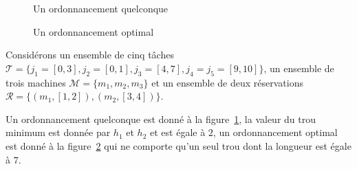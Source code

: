 \documentclass[a4paper,11pt]{thesis}
\begin{document}
\begin{figure}
    \begin{center}
        \begin{ordo}[10]{3}{1}{10}


        \end{ordo}
    \end{center}
    \caption{Un ordonnancement quelconque}
    \label{ex1ordquelc}
\end{figure}
            
\begin{figure}
    \begin{center}
        \begin{ordo}[10]{3}{1}{10}


        \end{ordo}
    \end{center}
    \caption{Un ordonnancement optimal}
    \label{ex1ordopt}
\end{figure}

\begin{ex}
    Considérons un ensemble de cinq tâches $\mathcal{T} = \{j_1 = [0, 3], j_2 = [0,1], j_3 = [4,7],
    j_4 = j_5 = [9,10]\}$, un ensemble de trois machines $\mathcal{M} = \{m_1, m_2, m_3\}$ et un
    ensemble de deux réservations $\mathcal{R} = \{(m_1, [1,2]), (m_2, [3,4])\}$.

    Un ordonnancement quelconque est donné à la figure~\ref{ex1ordquelc}, la valeur du trou minimum
    est donnée par $h_1$ et $h_2$ et est égale à $2$, un ordonnancement optimal est donné à la
    figure~\ref{ex1ordopt} qui ne comporte qu'un seul trou dont la longueur est égale à $7$.
\end{ex}
\end{document}
